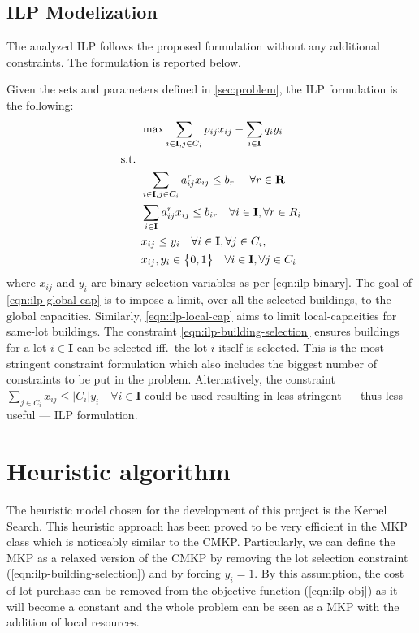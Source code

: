 \documentclass[a4paper, twocolumn, oneside, 10pt]{article}
\begin{document}
\subsection{ILP Modelization}
The analyzed \ac{ILP} follows the proposed formulation\cite{assignment} without any additional constraints. The formulation is reported below.

Given the sets and parameters defined in \cref{sec:problem}, the \ac{ILP} formulation is the following:
\begin{align}
	&\max \sum_{i \in \mathbf{I}, j \in C_i} p_{ij}x_{ij} - \sum_{i\in\mathbf{I}} q_{i}y_i \label{eqn:ilp-obj}\\
	\omit s.t. \notag & \\
	&\sum_{i \in \mathbf{I}, j \in C_i} a^r_{ij}x_{ij} \leq b_r \ \quad \forall r \in \mathbf{R} \label{eqn:ilp-global-cap}\\
	&\sum_{i \in \mathbf{I}} a^r_{ij}x_{ij} \leq b_{ir} \quad  \forall i \in \mathbf{I}, \forall r \in R_i \label{eqn:ilp-local-cap} \\
	&x_{ij} \leq y_i \quad \forall i \in \mathbf{I}, \forall j \in C_i, \label{eqn:ilp-building-selection}\\
	&x_{ij}, y_i \in \big\{0, 1\big\} \quad \forall i \in \mathbf{I}, \forall j \in C_i \label{eqn:ilp-binary}
\end{align}
where \(x_{ij}\) and \(y_i\) are binary selection variables as per \cref{eqn:ilp-binary}.
The goal of \cref{eqn:ilp-global-cap} is to impose a limit, over all the selected buildings, to the global capacities. Similarly, \cref{eqn:ilp-local-cap} aims to limit local-capacities for same-lot buildings.
The constraint \cref{eqn:ilp-building-selection} ensures buildings for a lot \(i \in \mathbf{I}\) can be selected iff.\ the lot \(i\) itself is selected.
This is the most stringent constraint formulation which also includes the biggest number of constraints to be put in the problem. Alternatively, the constraint \(\sum_{j \in C_i} x_{ij} \leq |C_i|y_i \quad \forall i \in \mathbf{I}\) could be used resulting in less stringent --- thus less useful --- \ac{ILP} formulation.

\section{Heuristic algorithm}\label{sec:heuristic}
The heuristic model chosen for the development of this project is the Kernel Search\cite{angelelli2010kernel}. This heuristic approach has been proved to be very efficient in the \ac{MKP} class which is noticeably similar to the \ac{CMKP}. Particularly, we can define the \ac{MKP} as a relaxed version of the \ac{CMKP} by removing the lot selection constraint (\cref{eqn:ilp-building-selection}) and by forcing \(y_i = 1\). By this assumption, the cost of lot purchase can be removed from the objective function (\cref{eqn:ilp-obj}) as it will become a constant and the whole problem can be seen as a \ac{MKP} with the addition of local resources.
\end{document}
